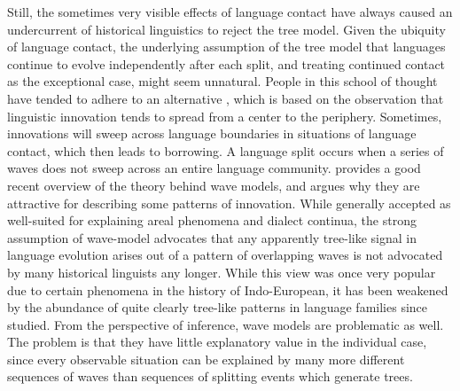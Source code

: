 Still, the sometimes very visible effects of language contact have always caused an undercurrent of historical linguistics to reject the tree model. Given the ubiquity of language contact, the underlying assumption of the tree model that languages continue to evolve independently after each split, and treating continued contact as the exceptional case, might seem unnatural. People in this school of thought have tended to adhere to an alternative , which is based on the observation that linguistic innovation tends to spread from a center to the periphery. Sometimes, innovations will sweep across language boundaries in situations of language contact, which then leads to borrowing. A language split occurs when a series of waves does not sweep across an entire language community. \citet{francois2014} provides a good recent overview of the theory behind wave models, and argues why they are attractive for describing some patterns of innovation. While generally accepted as well-suited for explaining areal phenomena and dialect continua, the strong assumption of wave-model advocates that any apparently tree-like signal in language evolution arises out of a pattern of overlapping waves is not advocated by many historical linguists any longer. While this view was once very popular due to certain phenomena in the history of Indo-European, it has been weakened by the abundance of quite clearly tree-like patterns in language families since studied. From the perspective of inference, wave models are problematic as well. The problem is that they have little explanatory value in the individual case, since every observable situation can be explained by many more different sequences of waves than sequences of splitting events which generate trees.

\largerpage[-1]
